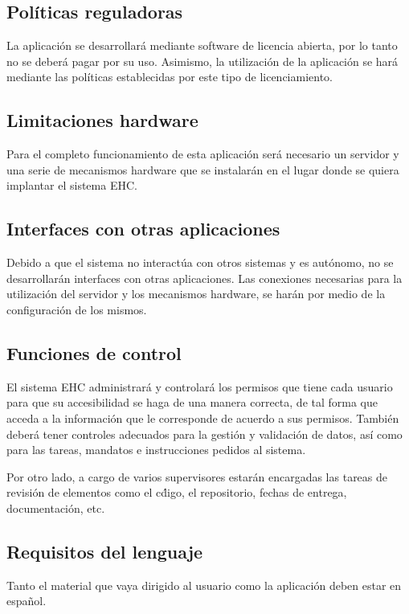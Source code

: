     \subsection{Políticas reguladoras}
        La aplicación se desarrollará mediante software de licencia abierta, por lo tanto no se deberá pagar por su uso. Asimismo, la utilización de la aplicación se hará mediante las políticas establecidas por este tipo de licenciamiento.

    \subsection{Limitaciones hardware}
        Para el completo funcionamiento de esta aplicación será necesario un servidor y una serie de mecanismos hardware que se instalarán en el lugar donde se quiera implantar el sistema EHC.

    \subsection{Interfaces con otras aplicaciones}
        Debido a que el sistema no interactúa con otros sistemas y es autónomo, no se desarrollarán interfaces con otras aplicaciones. Las conexiones necesarias para la utilización del servidor y los mecanismos hardware, se harán por medio de la configuración de los mismos.


    \subsection{Funciones de control}
        El sistema EHC administrará y controlará los permisos que tiene cada usuario para que su accesibilidad se haga de una manera correcta, de tal forma que acceda a la información que le corresponde de acuerdo a sus permisos. También deberá tener controles adecuados para la gestión y validación de datos, así como para las tareas, mandatos e instrucciones pedidos al sistema.

        Por otro lado, a cargo de varios supervisores estarán encargadas las tareas de revisión de elementos como el c\'digo, el repositorio, fechas de entrega, documentación, etc.

    \subsection{Requisitos del lenguaje}
        Tanto el material que vaya dirigido al usuario como la aplicación deben estar en espa\~nol.

